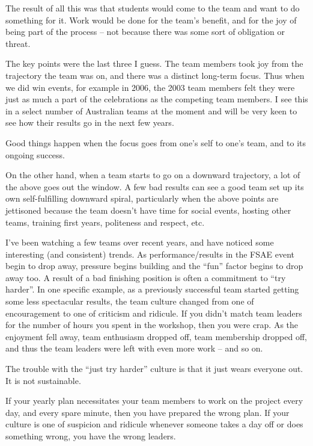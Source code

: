 \documentclass[10pt, a4paper, article, oneside, twocolumn, final]{memoir}
\begin{document}
The result of all this was that students would come to the team and want to do something for it. Work would be done for the team’s benefit, and for the joy of being part of the process -- not because there was some sort of obligation or threat. 

The key points were the last three I guess. The team members took joy from the trajectory the team was on, and there was a distinct long-term focus. Thus when we did win events, for example in 2006, the 2003 team members felt they were just as much a part of the celebrations as the competing team members. I see this in a select number of Australian teams at the moment and will be very keen to see how their results go in the next few years. 

Good things happen when the focus goes from one’s self to one’s team, and to its ongoing success. 

On the other hand, when a team starts to go on a downward trajectory, a lot of the above goes out the window. A few bad results can see a good team set up its own self-fulfilling downward spiral, particularly when the above points are jettisoned because the team doesn’t have time for social events, hosting other teams, training first years, politeness and respect, etc.

I've been watching a few teams over recent years, and have noticed some interesting (and consistent) trends. As performance/\allowbreak results in the FSAE event begin to drop away, pressure begins building and the “fun” factor begins to drop away too. A result of a bad finishing position is often a commitment to “try harder”. In one specific example, as a previously successful team started getting some less spectacular results, the team culture changed from one of encouragement to one of criticism and ridicule. If you didn’t match team leaders for the number of hours you spent in the workshop, then you were crap. As the enjoyment fell away, team enthusiasm dropped off, team membership dropped off, and thus the team leaders were left with even more work -- and so on. 

The trouble with the “just try harder” culture is that it just wears everyone out. It is not sustainable.

If your yearly plan necessitates your team members to work on the project every day, and every spare minute, then you have prepared the wrong plan. If your culture is one of suspicion and ridicule whenever someone takes a day off or does something wrong, you have the wrong leaders.
\end{document}
